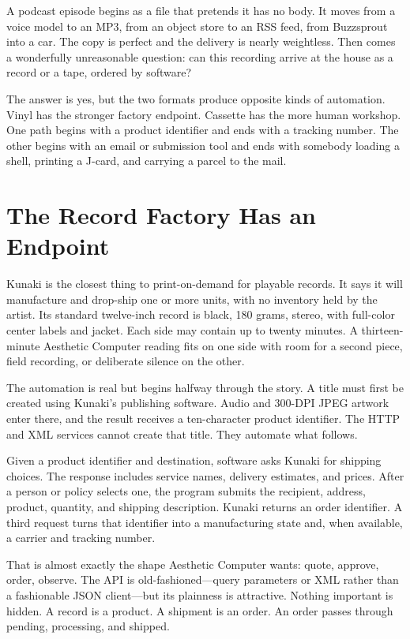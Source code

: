 \documentclass[11pt,letterpaper]{article}
\begin{document}
\thispagestyle{empty}

A podcast episode begins as a file that pretends it has no body. It moves from a voice model to an MP3, from an object store to an RSS feed, from Buzzsprout into a car. The copy is perfect and the delivery is nearly weightless. Then comes a wonderfully unreasonable question: can this recording arrive at the house as a record or a tape, ordered by software?

The answer is yes, but the two formats produce opposite kinds of automation. Vinyl has the stronger factory endpoint. Cassette has the more human workshop. One path begins with a product identifier and ends with a tracking number. The other begins with an email or submission tool and ends with somebody loading a shell, printing a J-card, and carrying a parcel to the mail.

\section{The Record Factory Has an Endpoint}

Kunaki is the closest thing to print-on-demand for playable records. It says it will manufacture and drop-ship one or more units, with no inventory held by the artist. Its standard twelve-inch record is black, 180 grams, stereo, with full-color center labels and jacket. Each side may contain up to twenty minutes. A thirteen-minute Aesthetic Computer reading fits on one side with room for a second piece, field recording, or deliberate silence on the other.

The automation is real but begins halfway through the story. A title must first be created using Kunaki's publishing software. Audio and 300-DPI JPEG artwork enter there, and the result receives a ten-character product identifier. The HTTP and XML services cannot create that title. They automate what follows.

Given a product identifier and destination, software asks Kunaki for shipping choices. The response includes service names, delivery estimates, and prices. After a person or policy selects one, the program submits the recipient, address, product, quantity, and shipping description. Kunaki returns an order identifier. A third request turns that identifier into a manufacturing state and, when available, a carrier and tracking number.

That is almost exactly the shape Aesthetic Computer wants: quote, approve, order, observe. The API is old-fashioned---query parameters or XML rather than a fashionable JSON client---but its plainness is attractive. Nothing important is hidden. A record is a product. A shipment is an order. An order passes through pending, processing, and shipped.
\end{document}
